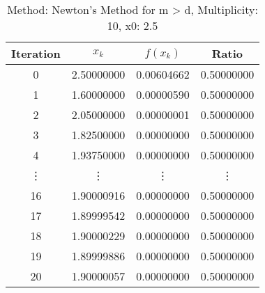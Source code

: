 \begin{table}
\centering
\caption{Method: Newton's Method for m > d, Multiplicity: 10, x0: 2.5}
\label{tab:table_Newton's_Method_for_m_>_d_10_2_5}
\begin{tabular}{c c c c}
\toprule
Iteration &      $x_k$ &   $f(x_k)$ &      Ratio \\
\midrule
        0 & 2.50000000 & 0.00604662 & 0.50000000 \\
        1 & 1.60000000 & 0.00000590 & 0.50000000 \\
        2 & 2.05000000 & 0.00000001 & 0.50000000 \\
        3 & 1.82500000 & 0.00000000 & 0.50000000 \\
        4 & 1.93750000 & 0.00000000 & 0.50000000 \\
   \vdots &     \vdots &     \vdots &     \vdots \\
       16 & 1.90000916 & 0.00000000 & 0.50000000 \\
       17 & 1.89999542 & 0.00000000 & 0.50000000 \\
       18 & 1.90000229 & 0.00000000 & 0.50000000 \\
       19 & 1.89999886 & 0.00000000 & 0.50000000 \\
       20 & 1.90000057 & 0.00000000 & 0.50000000 \\
\bottomrule
\end{tabular}
\end{table}
